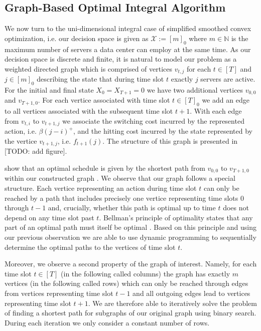 \subsection{Graph-Based Optimal Integral Algorithm}

We now turn to the uni-dimensional integral case of simplified smoothed convex optimization, i.e. our decision space is given as $\mathcal{X} := [m]_0$ where $m \in \mathbb{N}$ is the maximum number of servers a data center can employ at the same time. As our decision space is discrete and finite, it is natural to model our problem as a weighted directed graph which is comprised of vertices $v_{t,j}$ for each $t \in [T]$ and $j \in [m]_0$ describing the state that during time slot $t$ exactly $j$ servers are active. For the initial and final state $X_0 = X_{T+1} = 0$ we have two additional vertices $v_{0,0}$ and $v_{T+1,0}$. For each vertice associated with time slot $t \in [T]_0$ we add an edge to all vertices associated with the subsequent time slot $t + 1$. With each edge from $v_{t,i}$ to $v_{t+1,j}$ we associate the switching cost incurred by the represented action, i.e. $\beta (j - i)^+$, and the hitting cost incurred by the state represented by the vertice $v_{t+1,j}$, i.e. $f_{t+1}(j)$. The structure of this graph is presented in [TODO: add figure].

\citeauthor*{Albers2018} show that an optimal schedule is given by the shortest path from $v_{0,0}$ to $v_{T+1,0}$ within our constructed graph \cite{Albers2018}. We observe that our graph follows a special structure. Each vertice representing an action during time slot $t$ can only be reached by a path that includes precisely one vertice representing time slots $0$ through $t - 1$ and, crucially, whether this path is optimal up to time $t$ does not depend on any time slot past $t$. Bellman's principle of optimality states that any part of an optimal path must itself be optimal \cite{Bellman1954}. Based on this principle and using our previous observation we are able to use dynamic programming to sequentially determine the optimal paths to the vertices of time slot $t$.

Moreover, we observe a second property of the graph of interest. Namely, for each time slot $t \in [T]$ (in the following called columns) the graph has exactly $m$ vertices (in the following called rows) which can only be reached through edges from vertices representing time slot $t - 1$ and all outgoing edges lead to vertices representing time slot $t + 1$. We are therefore able to iteratively solve the problem of finding a shortest path for subgraphs of our original graph using binary search. During each iteration we only consider a constant number of rows.

